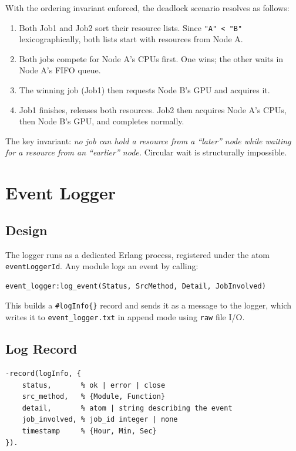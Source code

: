 \documentclass[12pt,a4paper]{article}
\begin{document}
With the ordering invariant enforced, the deadlock scenario resolves as follows:

\begin{enumerate}
  \item Both Job1 and Job2 sort their resource lists. Since \texttt{"A" < "B"}
        lexicographically, both lists start with resources from Node A.
  \item Both jobs compete for Node A's CPUs first. One wins; the other waits
        in Node A's FIFO queue.
  \item The winning job (Job1) then requests Node B's GPU and acquires it.
  \item Job1 finishes, releases both resources. Job2 then acquires Node A's CPUs,
        then Node B's GPU, and completes normally.
\end{enumerate}

The key invariant: \textit{no job can hold a resource from a ``later'' node while
waiting for a resource from an ``earlier'' node.} Circular wait is structurally
impossible.

\section{Event Logger}

\subsection{Design}

The logger runs as a dedicated Erlang process, registered under the atom
\texttt{eventLoggerId}. Any module logs an event by calling:

\begin{lstlisting}
event_logger:log_event(Status, SrcMethod, Detail, JobInvolved)
\end{lstlisting}

This builds a \texttt{\#logInfo\{\}} record and sends it as a message to the logger,
which writes it to \texttt{event\_logger.txt} in append mode using \texttt{raw} file I/O.

\subsection{Log Record}

\begin{lstlisting}
-record(logInfo, {
    status,       % ok | error | close
    src_method,   % {Module, Function}
    detail,       % atom | string describing the event
    job_involved, % job_id integer | none
    timestamp     % {Hour, Min, Sec}
}).
\end{lstlisting}
\end{document}
